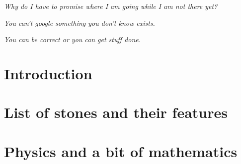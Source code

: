 \documentclass[a4paper]{article}
\numberwithin{equation}{section}
\begin{document}
\vspace{7cm}

\begin{center}
{\sl Why do I have to promise where I am going while I am not there yet?}

\vspace{1cm}

{\sl You can't google something you don't know exists.}

\vspace{1cm}

{\sl You can be correct or you can get stuff done.}
\end{center}





\newpage
\maketitle
\tableofcontents


\newpage
\section{Introduction} %
 

\newpage
\section{List of stones and their features} %
 

\newpage
\section{Physics and a bit of mathematics} \label{chapt3} %
 

\newpage
\end{document}
